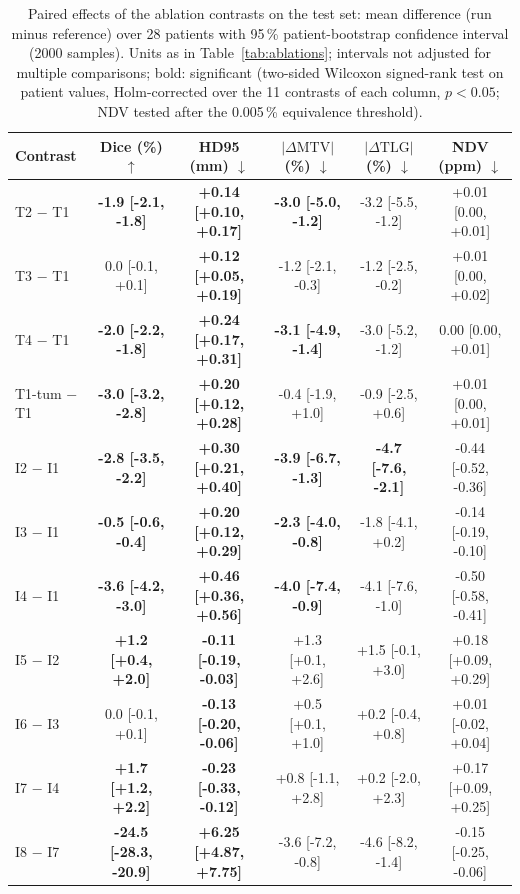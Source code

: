 \begin{table}[t]
\centering
\caption{Paired effects of the ablation contrasts on the test set: mean difference (run minus reference) over 28 patients with 95\,\% patient-bootstrap confidence interval (2000 samples). Units as in Table~\ref{tab:ablations}; intervals not adjusted for multiple comparisons; bold: significant (two-sided Wilcoxon signed-rank test on patient values, Holm-corrected over the 11 contrasts of each column, $p<0.05$; NDV tested after the 0.005\,\% equivalence threshold).}
\label{tab:ablation_effects}
\scriptsize
\setlength{\tabcolsep}{2.5pt}
\begin{tabular}{lccccc}
\toprule
Contrast & Dice (\%) $\uparrow$ & HD95 (mm) $\downarrow$ & $|\Delta\mathrm{MTV}|$ (\%) $\downarrow$ & $|\Delta\mathrm{TLG}|$ (\%) $\downarrow$ & NDV (ppm) $\downarrow$ \\
\midrule
T2 $-$ T1 & \textbf{-1.9 [-2.1, -1.8]} & \textbf{+0.14 [+0.10, +0.17]} & \textbf{-3.0 [-5.0, -1.2]} & -3.2 [-5.5, -1.2] & +0.01 [0.00, +0.01] \\
T3 $-$ T1 & 0.0 [-0.1, +0.1] & \textbf{+0.12 [+0.05, +0.19]} & -1.2 [-2.1, -0.3] & -1.2 [-2.5, -0.2] & +0.01 [0.00, +0.02] \\
T4 $-$ T1 & \textbf{-2.0 [-2.2, -1.8]} & \textbf{+0.24 [+0.17, +0.31]} & \textbf{-3.1 [-4.9, -1.4]} & -3.0 [-5.2, -1.2] & 0.00 [0.00, +0.01] \\
T1-tum $-$ T1 & \textbf{-3.0 [-3.2, -2.8]} & \textbf{+0.20 [+0.12, +0.28]} & -0.4 [-1.9, +1.0] & -0.9 [-2.5, +0.6] & +0.01 [0.00, +0.01] \\
\midrule
I2 $-$ I1 & \textbf{-2.8 [-3.5, -2.2]} & \textbf{+0.30 [+0.21, +0.40]} & \textbf{-3.9 [-6.7, -1.3]} & \textbf{-4.7 [-7.6, -2.1]} & -0.44 [-0.52, -0.36] \\
I3 $-$ I1 & \textbf{-0.5 [-0.6, -0.4]} & \textbf{+0.20 [+0.12, +0.29]} & \textbf{-2.3 [-4.0, -0.8]} & -1.8 [-4.1, +0.2] & -0.14 [-0.19, -0.10] \\
I4 $-$ I1 & \textbf{-3.6 [-4.2, -3.0]} & \textbf{+0.46 [+0.36, +0.56]} & \textbf{-4.0 [-7.4, -0.9]} & -4.1 [-7.6, -1.0] & -0.50 [-0.58, -0.41] \\
\midrule
I5 $-$ I2 & \textbf{+1.2 [+0.4, +2.0]} & \textbf{-0.11 [-0.19, -0.03]} & +1.3 [+0.1, +2.6] & +1.5 [-0.1, +3.0] & +0.18 [+0.09, +0.29] \\
I6 $-$ I3 & 0.0 [-0.1, +0.1] & \textbf{-0.13 [-0.20, -0.06]} & +0.5 [+0.1, +1.0] & +0.2 [-0.4, +0.8] & +0.01 [-0.02, +0.04] \\
I7 $-$ I4 & \textbf{+1.7 [+1.2, +2.2]} & \textbf{-0.23 [-0.33, -0.12]} & +0.8 [-1.1, +2.8] & +0.2 [-2.0, +2.3] & +0.17 [+0.09, +0.25] \\
\midrule
I8 $-$ I7 & \textbf{-24.5 [-28.3, -20.9]} & \textbf{+6.25 [+4.87, +7.75]} & -3.6 [-7.2, -0.8] & -4.6 [-8.2, -1.4] & -0.15 [-0.25, -0.06] \\
\bottomrule
\end{tabular}
\end{table}
